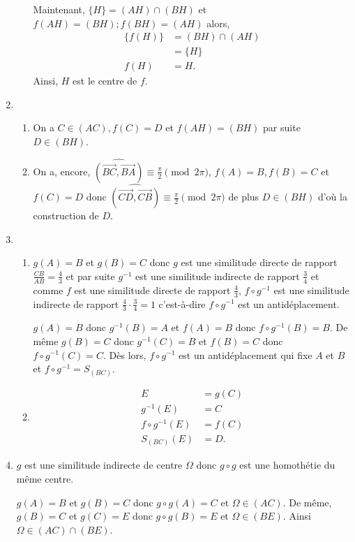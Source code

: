 \documentclass{article}
\newcommand{\angorio}[2]{\widehat{(\overrightarrow{#1}, \overrightarrow{#2})}}
\begin{document}
\begin{enumerate}
\begin{enumerate}[label=(\alph*)]
		Maintenant, $\{H\}=(AH)\cap(BH)$ et $f(AH)=(BH); f(BH)=(AH)$ alors,
		\begin{align*}
			\{f(H)\}&=(BH)\cap(AH)\\
			&=\{H\}\\
			f(H)&=H.
		\end{align*}
		Ainsi, $H$ est le centre de $f$.
	\end{enumerate}
	\item \begin{enumerate}[label=(\alph*)]
		\item On a $C\in(AC), f(C)=D$ et $f(AH)=(BH)$ par suite $D\in(BH)$.\\
		\item On a, encore, $\angorio{BC}{BA}\equiv\frac{\pi}{2}\pmod{2\pi}$, $f(A)=B, f(B)=C$ et $f(C)=D$ donc $\angorio{CD}{CB}\equiv\frac{\pi}{2}\pmod{2\pi}$ de plus $D\in(BH)$ d'où la construction de $D$.
	\end{enumerate}
	\item \begin{enumerate}[label=(\alph*)]
		\item $g(A)=B$ et $g(B)=C$ donc $g$ est une similitude directe de rapport $\frac{CB}{AB}=\frac{4}{3}$ et par suite $g^{-1}$ est une similitude indirecte de rapport $\frac{3}{4}$ et comme $f$ est une similitude directe de rapport $\frac{4}{3}$, $f\circ g^{-1}$ est une similitude indirecte de rapport $\frac{4}{3}\cdot\frac{3}{4}=1$ c'est-à-dire $f\circ g^{-1}$ est un antidéplacement.


		$g(A)=B$ donc $g^{-1}(B)=A$ et $f(A)=B$ donc $f\circ g^{-1}(B)=B$. De même $g(B)=C$ donc $g^{-1}(C)=B$ et $f(B)=C$ donc $f\circ g^{-1}(C)=C$. Dès lors, $f\circ g^{-1}$ est un antidéplacement qui fixe $A$ et $B$ et $f\circ g^{-1}=S_{(BC)}$. 
		\item \begin{align*}
			E&=g(C)\\
			g^{-1}(E)&=C\\
			f\circ g^{-1}(E)&=f(C)\\
			S_{(BC)}(E)&=D.
		\end{align*}
		\end{enumerate}
	\item $g$ est une similitude indirecte de centre $\Omega$ donc $g\circ g$ est une homothétie du même centre.
		
		$g(A)=B$ et $g(B)=C$ donc $g\circ g(A)=C$ et $\Omega\in(AC)$.
		De même, $g(B)=C$ et $g(C)=E$ donc $g\circ g(B)=E$ et $\Omega\in(BE)$.
		Ainsi $\Omega\in(AC)\cap(BE)$.
\end{enumerate}
\end{document}
